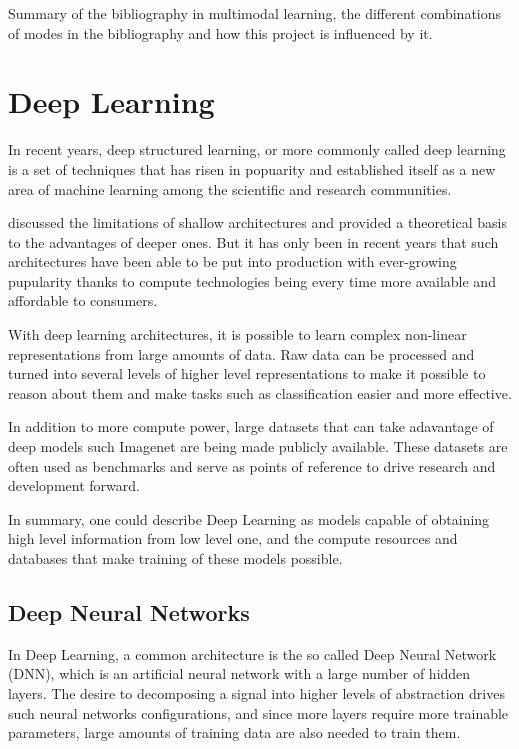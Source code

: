 Summary of the bibliography in multimodal learning, the different combinations of modes in the bibliography and how this project is influenced by it.

\section{Deep Learning}

In recent years, deep structured learning, or more commonly called deep learning is a set of techniques that has risen in popuarity and established itself as a new area of machine learning among the scientific and research communities. \cite{deng2014deep}

\cite{bengio2009learning} discussed the limitations of shallow architectures and provided a theoretical basis to the advantages of deeper ones. But it has only been in recent years that such architectures have been able to be put into production with ever-growing pupularity thanks to compute technologies being every time more available and affordable to consumers.

With deep learning architectures, it is possible to learn complex non-linear representations from large amounts of data. Raw data can be processed and turned into several levels of higher level representations to make it possible to reason about them and make tasks such as classification easier and more effective.

In addition to more compute power, large datasets that can take adavantage of deep models such Imagenet \cite{russakovsky2015imagenet} are being made publicly available. These datasets are often used as benchmarks and serve as points of reference to drive research and development forward.

In summary, one could describe Deep Learning as models capable of obtaining high level information from low level one, and the compute resources and databases that make training of these models possible.

\subsection{Deep Neural Networks}

In Deep Learning, a common architecture is the so called Deep Neural Network (DNN), which is an artificial neural network with a large number of hidden layers. The desire to decomposing a signal into higher levels of abstraction drives such neural networks configurations, and since more layers require more trainable parameters, large amounts of training data are also needed to train them.


